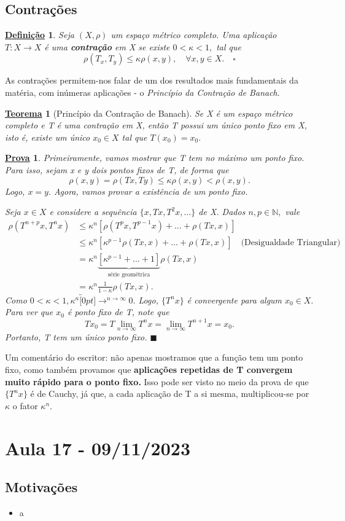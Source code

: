 \documentclass{article}
\newtheorem*{def*}{\underline{Defini\c c\~ao}}
\newtheorem*{theorem*}{\underline{Teorema}}
\newtheorem*{proof*}{\underline{Prova}}
\renewcommand\qedsymbol{$\blacksquare$}
\begin{document}
\subsection{Contrações} 
\begin{def*}
  Seja \((X, \rho )\) um espaço métrico completo. Uma aplicação \(T:X\rightarrow X\) é uma \textbf{contração} em X se existe \(0 < \kappa < 1,\) tal que 
  \[
    \rho (T_{x}, T_{y})\leq \kappa \rho (x, y),\quad \forall x, y\in X.\quad\square
  \]
\end{def*}
  As contrações permitem-nos falar de um dos resultados mais fundamentais da matéria, com inúmeras aplicações - o \textit{Princípio da Contração de Banach}.
\hypertarget{banach_contraction}{\begin{theorem*}[Princípio da Contração de Banach]
  Se X é um espaço métrico completo e T é uma contração em X, então T possui um único ponto fixo em X, isto é, existe um único \(x_{0}\in X\) tal que \(T(x_{0}) = x_{0}.\)
\end{theorem*}}
\begin{proof*}
  Primeiramente, vamos mostrar que T tem no máximo um ponto fixo. Para isso, sejam x e y dois pontos fixos de T, de forma que 
  \[
    \rho (x, y) = \rho (Tx, Ty)\leq \kappa \rho (x, y) < \rho (x, y).
  \]
  Logo, \(x=y.\) Agora, vamos provar a existência de um ponto fixo. 

  Seja \(x\in X\) e considere a sequência \(\{x, Tx, T^{2}x, \dotsc\}\) de X. Dados \(n, p\in \mathbb{N},\) vale
 \begin{align*}
  \rho (T^{n+p}x, T^{n}x) &\leq \kappa^{n}[\rho (T^{p}x, T^{p-1}x) + \dotsc + \rho (Tx, x)]\\
                          &\leq \kappa^{n}[\kappa^{p-1}\rho (Tx, x) + \dotsc + \rho(Tx, x)]\quad \text{(Desigualdade Triangular)}\\
                          &= \kappa ^{n}\underbrace{[\kappa^{p-1} + \dotsc + 1]}_{\text{série geométrica}}\rho(Tx, x)\\
                          &= \kappa ^{n}\frac{1}{1-\kappa }\rho (Tx, x).
 \end{align*}
 Como \(0 < \kappa < 1, \kappa ^{n}\overbracket[0pt]{\longrightarrow}^{n\to \infty}0.\) Logo, \(\{T^{n}x\}\) é convergente para algum \(x_{0}\in X.\)
Para ver que \(x_{0}\) é ponto fixo de T, note que 
  \[
    Tx_{0} = T \lim_{n\to \infty}T^{n}x = \lim_{n\to \infty}T^{n+1}x = x_{0}.
  \]
  Portanto, T tem um único ponto fixo. \qedsymbol
\end{proof*}
  Um comentário do escritor: não apenas mostramos que a função tem um ponto fixo, como também provamos que \textbf{aplicações repetidas de T convergem muito rápido para o ponto fixo.}
Isso pode ser visto no meio da prova de que \(\{T^{n}x\}\) é de Cauchy, já que, a cada aplicação de T a si mesma, multiplicou-se por \(\kappa \) o fator \(\kappa^{n}.\)
\newpage

\section{Aula 17 - 09/11/2023}
\subsection{Motivações} 
\begin{itemize}
  \item a
\end{itemize}
\end{document}
